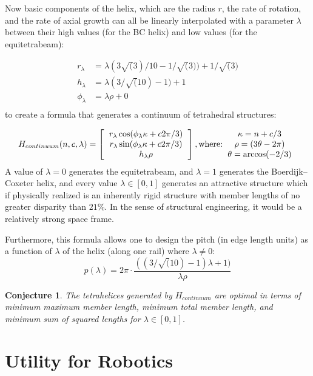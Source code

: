 \documentclass[11pt]{article}
\newtheorem{conjecture}{Conjecture}
\begin{document}
Now basic components of the helix, which are the radius $r$, the rate of rotation, and the rate of
axial growth can all be linearly interpolated with a parameter $\lambda$ between their high values (for the BC helix)
and low values (for the equitetrabeam):

\begin{align*}
r_{\lambda}  &=  \lambda (3 \sqrt(3) / 10 - 1/\sqrt(3)) +  1/\sqrt(3) \\
h_{\lambda} &=   \lambda (3 / \sqrt(10) - 1)+ 1 \\
\phi_{\lambda} &=  \lambda \rho  + 0\\
\end{align*}
to create a formula that generates a continuum of tetrahedral structures:

\[
H_{continuum}(n,c,\lambda) =
\left [
  \begin{tabular}{c}
   $ r_{\lambda} \cos(\phi_{\lambda} \kappa + c 2 \pi /3) $\\
   $ r_{\lambda}  \sin(\phi_{\lambda} \kappa + c 2 \pi /3) $\\
   $ h_{\lambda} \rho $
  \end{tabular}
  \right ],
\text{where:}
  \begin{tabular}{c}
 $\kappa = n + c/3$ \\
    $\rho = (3 \theta - 2 \pi)$ \\
   $ \theta = \arccos(-2/3) $
  \end{tabular}      
\]
A value of $\lambda = 0$ generates the equitetrabeam, and $\lambda = 1$ generates the Boerdijk--Coxeter helix, and every
value $\lambda \in [0,1]$ generates an attractive structure which if physically realized is an inherently rigid structure
with member lengths of no greater disparity than $21\%$.
In the sense of structural engineering, it would be a relatively strong space frame.

Furthermore, this formula allows one to design the pitch (in edge length units) as a function of $\lambda$ of the helix (along one rail)
where $\lambda \neq 0$:
\[
p(\lambda) = 2 \pi  \cdot \frac{((3/\sqrt(10) -1) \lambda +1)}{ \lambda  \rho }
\]

\begin{conjecture}
  The tetrahelices generated by $H_{continuum}$ are optimal in terms of minimum maximum member length, minimum total member length, and minimum
  sum of squared lengths for $\lambda \in [0,1]$.
\end{conjecture}

\section{Utility for Robotics}
\end{document}
